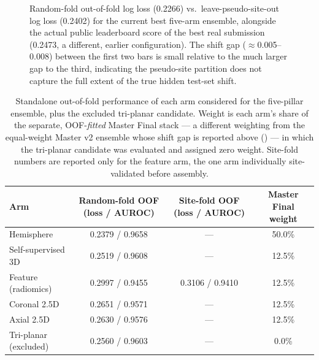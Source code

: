 \documentclass[11pt]{article}
\begin{document}
\begin{figure}[t]
\centering

\caption{Random-fold out-of-fold log loss (0.2266) vs.\ leave-pseudo-site-out log loss (0.2402) for the current best five-arm ensemble, alongside the actual public leaderboard score of the best real submission (0.2473, a different, earlier configuration). The shift gap ($\approx$0.005--0.008) between the first two bars is small relative to the much larger gap to the third, indicating the pseudo-site partition does not capture the full extent of the true hidden test-set shift.}
\label{fig:shiftgap}
\end{figure}

\begin{table}[t]
\centering
\small
\caption{Standalone out-of-fold performance of each arm considered for the five-pillar ensemble, plus the excluded tri-planar candidate. Weight is each arm's share of the separate, OOF-\emph{fitted} Master Final stack --- a different weighting from the equal-weight Master v2 ensemble whose shift gap is reported above () --- in which the tri-planar candidate was evaluated and assigned zero weight. Site-fold numbers are reported only for the feature arm, the one arm individually site-validated before assembly.}
\label{tab:arms}
\begin{tabular}{@{}lccc@{}}
\toprule
\textbf{Arm} & \textbf{Random-fold OOF (loss / AUROC)} & \textbf{Site-fold OOF (loss / AUROC)} & \textbf{Master Final weight} \\
\midrule
Hemisphere & 0.2379 / 0.9658 & --- & 50.0\% \\
Self-supervised 3D & 0.2519 / 0.9608 & --- & 12.5\% \\
Feature (radiomics) & 0.2997 / 0.9455 & 0.3106 / 0.9410 & 12.5\% \\
Coronal 2.5D & 0.2651 / 0.9571 & --- & 12.5\% \\
Axial 2.5D & 0.2630 / 0.9576 & --- & 12.5\% \\
\midrule
Tri-planar (excluded) & 0.2560 / 0.9603 & --- & 0.0\% \\
\bottomrule
\end{tabular}
\end{table}
\end{document}
